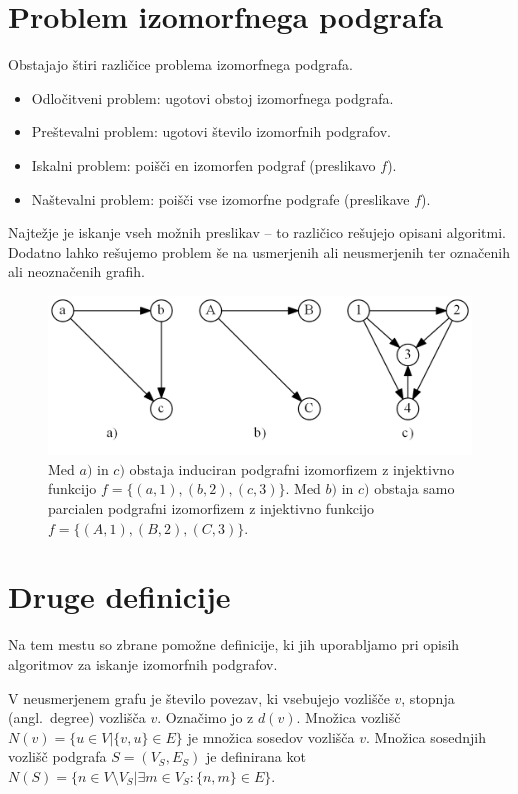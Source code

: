 \documentclass[a4paper, 12pt, ]{book}
\begin{document}
	\section{Problem izomorfnega podgrafa}
	Obstajajo štiri različice problema izomorfnega podgrafa.
	\begin{itemize}
		\item{Odločitveni problem: ugotovi obstoj izomorfnega podgrafa.}
		\item{Preštevalni problem: ugotovi število izomorfnih podgrafov.}
		\item{Iskalni problem: poišči en izomorfen podgraf (preslikavo $f$).}
		\item{Naštevalni problem: poišči vse izomorfne podgrafe (preslikave $f$).}
	\end{itemize}
	Najtežje je iskanje vseh možnih preslikav -- to različico rešujejo opisani algoritmi. Dodatno lahko rešujemo
	problem še na usmerjenih ali neusmerjenih ter označenih ali neoznačenih grafih.


	\begin{figure}
	\begin{center}
	\includegraphics[width=15cm]{img/graph_sub_izomorph.png}
	\end{center}
	\caption{Med $a)$ in $c)$ obstaja induciran podgrafni izomorfizem z injektivno funkcijo $f = \{(a, 1), (b, 2), (c, 3)\}$. Med $b)$ in $c)$ obstaja
	samo parcialen podgrafni izomorfizem z injektivno funkcijo $f = \{(A, 1), (B, 2), (C, 3)\}$.}
	\label{pic_sub_iso}
	\end{figure}



	\section{Druge definicije}
	Na tem mestu so zbrane pomožne definicije, ki jih uporabljamo pri opisih algoritmov za iskanje izomorfnih podgrafov.

	V neusmerjenem grafu je število povezav, ki vsebujejo vozlišče $v$, stopnja (angl.~degree) vozlišča $v$. Označimo jo z $d(v)$. Množica vozlišč
	$N(v) = \{u \in V \big| \{v, u\} \in E\}$ je množica sosedov vozlišča $v$. 
	Množica sosednjih vozlišč podgrafa $S = (V_S, E_S)$ je definirana kot 
	$N(S) = \{ n \in V \setminus V_S \big| \exists m \in V_S : \{n,m\} \in E \}$. 
\end{document}
